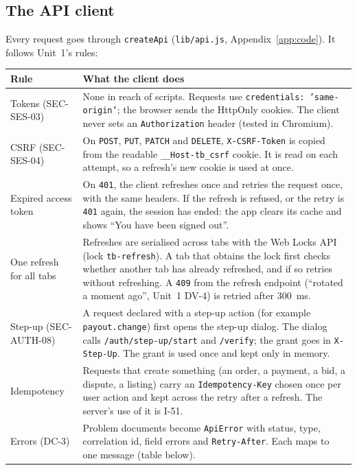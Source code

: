 \documentclass[11pt,a4paper]{article}
\newenvironment{dtable}[1]{\small\begin{longtable}{#1}}{\end{longtable}}
\begin{document}
\subsection{The API client}
\label{sec:api}
Every request goes through \texttt{createApi} (\texttt{lib/api.js}, Appendix~\ref{app:code}). It follows Unit~1's rules:
\begin{dtable}{@{}>{\raggedright\arraybackslash}p{3.6cm}>{\raggedright\arraybackslash}p{11.6cm}@{}}
\toprule
\textbf{Rule} & \textbf{What the client does} \\ \midrule \endhead
Tokens (SEC-SES-03) & None in reach of scripts. Requests use \texttt{credentials: 'same-origin'}; the browser sends the HttpOnly cookies. The client never sets an \texttt{Authorization} header (tested in Chromium). \\
CSRF (SEC-SES-04) & On \texttt{POST}, \texttt{PUT}, \texttt{PATCH} and \texttt{DELETE}, \texttt{X-CSRF-Token} is copied from the readable \texttt{\_\_Host-tb\_csrf} cookie. It is read on each attempt, so a refresh's new cookie is used at once. \\
Expired access token & On \texttt{401}, the client refreshes once and retries the request once, with the same headers. If the refresh is refused, or the retry is \texttt{401} again, the session has ended: the app clears its cache and shows ``You have been signed out''. \\
One refresh for all tabs & Refreshes are serialised across tabs with the Web Locks API (lock \texttt{tb-refresh}). A tab that obtains the lock first checks whether another tab has already refreshed, and if so retries without refreshing. A \texttt{409} from the refresh endpoint (``rotated a moment ago'', Unit~1 DV-4) is retried after 300~ms. \\
Step-up (SEC-AUTH-08) & A request declared with a step-up action (for example \texttt{payout.change}) first opens the step-up dialog. The dialog calls \texttt{/auth/step-up/start} and \texttt{/verify}; the grant goes in \texttt{X-Step-Up}. The grant is used once and kept only in memory. \\
Idempotency & Requests that create something (an order, a payment, a bid, a dispute, a listing) carry an \texttt{Idempotency-Key} chosen once per user action and kept across the retry after a refresh. The server's use of it is I-51. \\
Errors (DC-3) & Problem documents become \texttt{ApiError} with status, type, correlation id, field errors and \texttt{Retry-After}. Each maps to one message (table below). \\
\bottomrule
\end{dtable}
\end{document}
